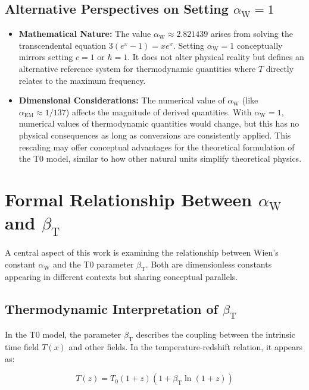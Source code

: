 \documentclass[12pt,a4paper]{article}
\newcommand{\Tfield}{T(x)}
\newcommand{\betaT}{\beta_{\text{T}}}
\newcommand{\alphaEM}{\alpha_{\text{EM}}}
\newcommand{\alphaW}{\alpha_{\text{W}}}
\begin{document}
	\subsection{Alternative Perspectives on Setting \(\alphaW = 1\)}
	
	\begin{itemize}
		\item \textbf{Mathematical Nature:} The value \(\alphaW \approx 2.821439\) arises from solving the transcendental equation \(3(e^x - 1) = xe^x\). Setting \(\alphaW = 1\) conceptually mirrors setting \(c = 1\) or \(\hbar = 1\). It does not alter physical reality but defines an alternative reference system for thermodynamic quantities where \(T\) directly relates to the maximum frequency.
		\item \textbf{Dimensional Considerations:} The numerical value of \(\alphaW\) (like \(\alphaEM \approx 1/137\)) affects the magnitude of derived quantities. With \(\alphaW = 1\), numerical values of thermodynamic quantities would change, but this has no physical consequences as long as conversions are consistently applied. This rescaling may offer conceptual advantages for the theoretical formulation of the T0 model, similar to how other natural units simplify theoretical physics.
	\end{itemize}
	
	\section{Formal Relationship Between \(\alphaW\) and \(\betaT\)}
	
	A central aspect of this work is examining the relationship between Wien’s constant \(\alphaW\) and the T0 parameter \(\betaT\). Both are dimensionless constants appearing in different contexts but sharing conceptual parallels.
	
	\subsection{Thermodynamic Interpretation of \(\betaT\)}
	
	In the T0 model, the parameter \(\betaT\) describes the coupling between the intrinsic time field \(\Tfield\) and other fields. In the temperature-redshift relation, it appears as:
	
	\begin{equation}
		T(z) = T_0 (1 + z) (1 + \betaT \ln(1 + z))
	\end{equation}
	
\end{document}
